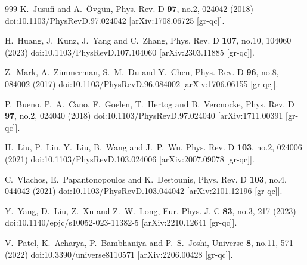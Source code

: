 \documentclass[aps,preprint,groupedaddress,nofootinbib,superscriptaddress,showkeys,showpacs,eqsecnum,amsmath,amssymb]{revtex4-1}
\begin{document}
\begin{thebibliography}{999}
K.~Jusufi and A.~\"Ovg\"un,
Phys. Rev. D \textbf{97}, no.2, 024042 (2018)
doi:10.1103/PhysRevD.97.024042
[arXiv:1708.06725 [gr-qc]].

H.~Huang, J.~Kunz, J.~Yang and C.~Zhang,
Phys. Rev. D \textbf{107}, no.10, 104060 (2023)
doi:10.1103/PhysRevD.107.104060
[arXiv:2303.11885 [gr-qc]].

Z.~Mark, A.~Zimmerman, S.~M.~Du and Y.~Chen,
Phys. Rev. D \textbf{96}, no.8, 084002 (2017)
doi:10.1103/PhysRevD.96.084002
[arXiv:1706.06155 [gr-qc]].

P.~Bueno, P.~A.~Cano, F.~Goelen, T.~Hertog and B.~Vercnocke,
Phys. Rev. D \textbf{97}, no.2, 024040 (2018)
doi:10.1103/PhysRevD.97.024040
[arXiv:1711.00391 [gr-qc]].

H.~Liu, P.~Liu, Y.~Liu, B.~Wang and J.~P.~Wu,
Phys. Rev. D \textbf{103}, no.2, 024006 (2021)
doi:10.1103/PhysRevD.103.024006
[arXiv:2007.09078 [gr-qc]].

C.~Vlachos, E.~Papantonopoulos and K.~Destounis,
Phys. Rev. D \textbf{103}, no.4, 044042 (2021)
doi:10.1103/PhysRevD.103.044042
[arXiv:2101.12196 [gr-qc]].

Y.~Yang, D.~Liu, Z.~Xu and Z.~W.~Long,
Eur. Phys. J. C \textbf{83}, no.3, 217 (2023)
doi:10.1140/epjc/s10052-023-11382-5
[arXiv:2210.12641 [gr-qc]].


V.~Patel, K.~Acharya, P.~Bambhaniya and P.~S.~Joshi,
Universe \textbf{8}, no.11, 571 (2022)
doi:10.3390/universe8110571
[arXiv:2206.00428 [gr-qc]].



\end{thebibliography}
\end{document}
